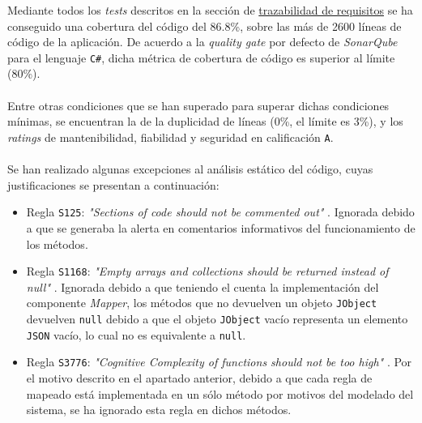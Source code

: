         \noindent Mediante todos los \textit{tests} descritos en la sección de \hyperref[subsec:trazabilidad]{trazabilidad de requisitos} se ha conseguido una cobertura del código del 86.8\%, sobre las más de 2600 líneas de código de la aplicación. De acuerdo a la \textit{quality gate} por defecto de \textit{SonarQube} para el lenguaje \texttt{C\#}, dicha métrica de cobertura de código es superior al límite (80\%).
        \\ \\
        Entre otras condiciones que se han superado para superar dichas condiciones mínimas, se encuentran la de la duplicidad de líneas (0\%, el límite es 3\%), y los \textit{ratings} de mantenibilidad, fiabilidad y seguridad en calificación \texttt{A}.
        \\ \\
        Se han realizado algunas excepciones al análisis estático del código, cuyas justificaciones se presentan a continuación:
        \begin{itemize}
            \item Regla \texttt{S125}: \textit{"Sections of code should not be commented out"} \cite{SONAR125}. Ignorada debido a que se generaba la alerta en comentarios informativos del funcionamiento de los métodos.
            \item Regla \texttt{S1168}: \textit{"Empty arrays and collections should be returned instead of null"} \cite{SONAR1168}. Ignorada debido a que teniendo el cuenta la implementación del componente \textit{Mapper}, los métodos que no devuelven un objeto \texttt{JObject} devuelven \texttt{null} debido a que el objeto \texttt{JObject} vacío representa un elemento \texttt{JSON} vacío, lo cual no es equivalente a \texttt{null}.
            \item Regla \texttt{S3776}: \textit{"Cognitive Complexity of functions should not be too high"} \cite{SONAR3776}. Por el motivo descrito en el apartado anterior, debido a que cada regla de mapeado está implementada en un sólo método por motivos del modelado del sistema, se ha ignorado esta regla en dichos métodos.
        \end{itemize}
    
\newpage